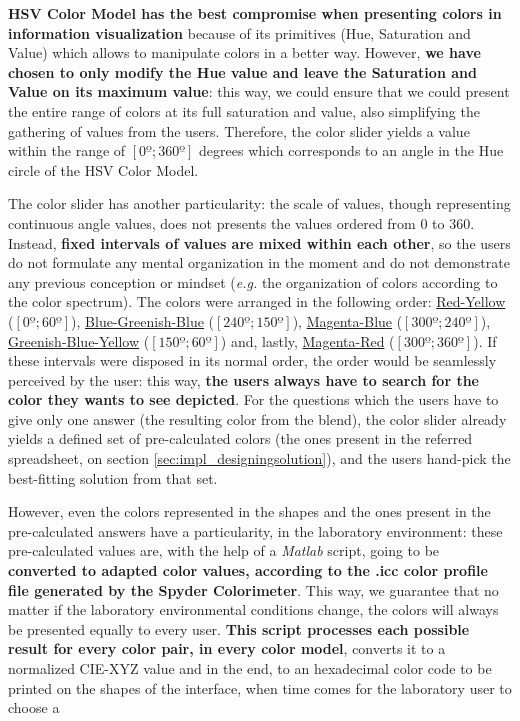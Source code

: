 \textbf{HSV Color Model has the best compromise when presenting colors in information visualization} because of its primitives (Hue, Saturation and Value)
which allows to manipulate colors in a better way. However, \textbf{we have chosen to only modify the Hue value and leave the Saturation and Value on its
maximum value}: this way, we could ensure that we could present the entire range of colors at its full saturation and value, also simplifying the gathering
of values from the users. Therefore, the color slider yields a value within the range of $[0º ; 360º]$ degrees which corresponds to an angle in the Hue circle
of the HSV Color Model. \par
%
The color slider has another particularity: the scale of values, though representing continuous angle values, does not presents the values ordered from 0 to 360.
Instead, \textbf{fixed intervals of values are mixed within each other}, so the users do not formulate any mental organization in the moment and do not demonstrate any previous conception or mindset
(\emph{e.g.} the organization of colors according to the color spectrum). The colors were arranged in the following order: \ul{Red-Yellow} ($[0º; 60º]$),
\ul{Blue-Greenish-Blue} ($[240º; 150º]$), \ul{Magenta-Blue} ($[300º; 240º]$), \ul{Greenish-Blue-Yellow} ($[150º; 60º]$) and, lastly, \ul{Magenta-Red} ($[300º; 360º]$). If these
intervals were disposed in its normal order, the order would be seamlessly perceived by the user: this way, \textbf{the users always have to search for the
color they wants to see depicted}. For the questions which the users have to give only one answer (the resulting color from the blend), the color slider
already yields a defined set of pre-calculated colors (the ones present in the referred spreadsheet, on section \ref{sec:impl_designingsolution}), and the
users hand-pick the best-fitting solution from that set. \par
%
However, even the colors represented in the shapes and the ones present in the pre-calculated answers have a particularity, in the laboratory environment: these
pre-calculated values are, with the help of a \emph{Matlab} script, going to be \textbf{converted to adapted color values, according to the .icc color profile
file generated by the Spyder Colorimeter}. This way, we guarantee that no matter if the laboratory environmental conditions change, the colors will always be
presented equally to every user. \textbf{This script processes each possible result for every color pair, in every color model}, converts it to a normalized
CIE-XYZ value and in the end, to an hexadecimal color code to be printed on the shapes of the interface, when time comes for the laboratory user to choose a
